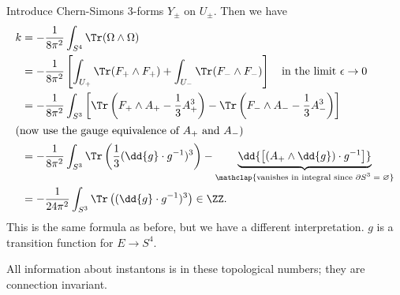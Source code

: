\documentclass{jknotes}
\begin{document}
Introduce Chern-Simons 3-forms \(Y_\pm\) on \(U_\pm\). Then we have
\begin{align}
    k &= -\frac{1}{8\pi^2} \int_{S^4} \Tr(\Omega \wedge \Omega) \\
      &= -\frac{1}{8\pi^2} \left[ \int_{U_+} \Tr(F_+\wedge F_+) + \int_{U_-} \Tr(F_-\wedge F_-) \right] \quad \text{in the limit \(\epsilon \to 0\)} \\
      &= -\frac{1}{8\pi^2} \int_{S^3} \left[\Tr\left(F_+\wedge A_+ - \frac{1}{3}A_+^3\right) - \Tr\left(F_-\wedge A_- - \frac{1}{3}A_-^3\right) \right] \\
    \intertext{(now use the gauge equivalence of \(A_+\) and \(A_-\))}
    &= -\frac{1}{8\pi^2}\int_{S^3} \Tr\left(\frac{1}{3}(\dd{g}\cdot g^{-1})^3\right) - \underbrace{\dd{\left[(A_+\wedge\dd{g})\cdot g^{-1}\right]}}_{\mathclap{\text{vanishes in integral since \(\partial S^3 = \varnothing\)}}} \\
    &= -\frac{1}{24\pi^2} \int_{S^3} \Tr \left((\dd{g}\cdot g^{-1})^3\right) \in \ZZ.
\end{align}
This is the same formula as before, but we have a different interpretation. \(g\) is a transition function for \(E\to S^4\).

All information about instantons is in these topological numbers; they are connection invariant.
\end{document}
